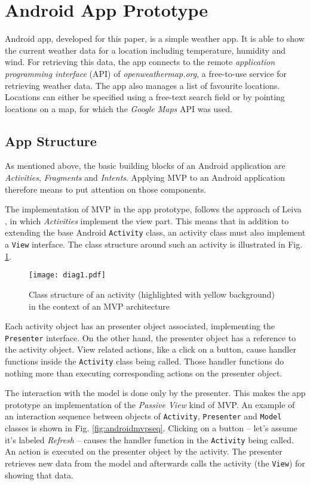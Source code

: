 
\section{Android App Prototype}

 Android app, developed for this paper, is a simple weather app. It is able to show the current weather data for a location including temperature, humidity and wind. For retrieving this data, the app connects to the remote \emph{application programming interface} (API) of \emph{openweathermap.org}, a free-to-use service for retrieving weather data. The app also manages a list of favourite locations. Locations can either be specified using a free-text search field or by pointing locations on a map, for which the \emph{Google Maps} API was used.

\subsection{App Structure}

As mentioned above, the basic building blocks of an Android application are \emph{Activities}, \emph{Fragments} and \emph{Intents}. Applying MVP to an Android application therefore means to put attention on those components.

The implementation of MVP in the app prototype, follows the approach of Leiva \cite{AntLeiv14}, in which \emph{Activities} implement the view part. This means that in addition to extending the base Android \texttt{Activity} class, an activity class must also implement a \texttt{View} interface. The class structure around such an activity is illustrated in Fig. \ref{fig:androidmvp}.

\begin{figure}[h]
\centering
\texttt{[image: diag1.pdf]}
\caption{Class structure of an activity (highlighted with yellow background) in the context of an MVP architecture}
\label{fig:androidmvp}
\end{figure}

Each activity object has an presenter object associated, implementing the \texttt{Presenter} interface. On the other hand, the presenter object has a reference to the activity object. View related actions, like a click on a button, cause handler functions inside the \texttt{Activity} class being called. Those handler functions do nothing more than executing corresponding actions on the presenter object.

The interaction with the model is done only by the presenter. This makes the app prototype an implementation of the \emph{Passive View} kind of MVP.
An example of an interaction sequence between objects of \texttt{Activity}, \texttt{Presenter} and \texttt{Model} classes is shown in Fig. \ref{fig:androidmvpseq}. Clicking on a button -- let's assume it's labeled \emph{Refresh} -- causes the handler function in the \texttt{Activity} being called. An action is executed on the presenter object by the activity. The presenter retrieves new data from the model and afterwards calls the activity (the \texttt{View}) for showing that data.

